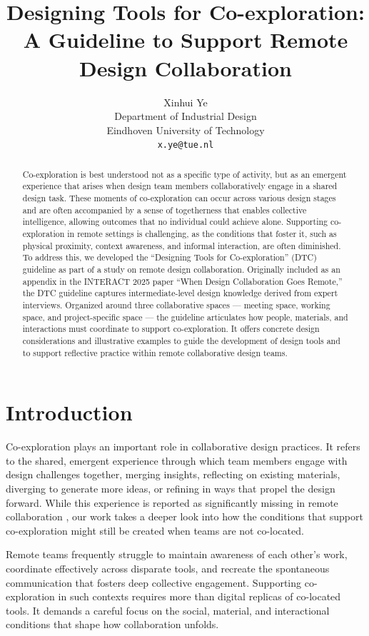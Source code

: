 \documentclass[11pt]{article}
\title{Designing Tools for Co-exploration: A Guideline to Support Remote Design Collaboration}
\author{
\begin{minipage}[t]{0.3\textwidth}
\centering
Xinhui Ye \\
Department of Industrial Design \\
Eindhoven University of Technology \\
\texttt{x.ye@tue.nl}
\end{minipage}
}
\date{}
\begin{document}
\maketitle

\begin{abstract}
Co-exploration is best understood not as a specific type of activity, but as an emergent experience that arises when design team members collaboratively engage in a shared design task. These moments of co-exploration can occur across various design stages and are often accompanied by a sense of togetherness that enables collective intelligence, allowing outcomes that no individual could achieve alone. Supporting co-exploration in remote settings is challenging, as the conditions that foster it, such as physical proximity, context awareness, and informal interaction, are often diminished. To address this, we developed the “Designing Tools for Co-exploration” (DTC) guideline as part of a study on remote design collaboration. Originally included as an appendix in the INTERACT 2025 paper “When Design Collaboration Goes Remote,” the DTC guideline captures intermediate-level design knowledge derived from expert interviews. Organized around three collaborative spaces — meeting space, working space, and project-specific space — the guideline articulates how people, materials, and interactions must coordinate to support co-exploration. It offers concrete design considerations and illustrative examples to guide the development of design tools and to support reflective practice within remote collaborative design teams.

\end{abstract}

\section{Introduction}

Co-exploration plays an important role in collaborative design practices. It refers to the shared, emergent experience through which team members engage with design challenges together, merging insights, reflecting on existing materials, diverging to generate more ideas, or refining in ways that propel the design forward. While this experience is reported as significantly missing in remote collaboration \cite{ye2021adjusting}, our work takes a deeper look into how the conditions that support co-exploration might still be created when teams are not co-located.

Remote teams frequently struggle to maintain awareness of each other's work, coordinate effectively across disparate tools, and recreate the spontaneous communication that fosters deep collective engagement. Supporting co-exploration in such contexts requires more than digital replicas of co-located tools. It demands a careful focus on the social, material, and interactional conditions that shape how collaboration unfolds.
\end{document}
